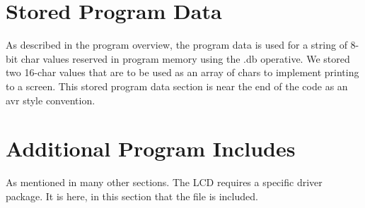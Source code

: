 \documentclass[12pt, letterpaper]{article}
\begin{document}

\section{Stored Program Data}

As described in the program overview, the program data is used for a string of 8-bit char values reserved in program memory using the .db operative. We stored two 16-char values that are to be used as an array of chars to implement printing to a screen. This stored program data section is near the end of the code as an avr style convention.

\section{Additional Program Includes}

As mentioned in many other sections. The LCD requires a specific driver package. It is here, in this section that the file is included.
\end{document}
